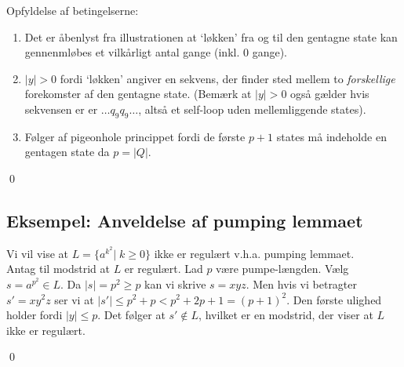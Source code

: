 Opfyldelse af betingelserne: 
\begin{enumerate}
	\item Det er åbenlyst fra illustrationen at `løkken' fra og til den gentagne state kan gennenmløbes et vilkårligt antal gange (inkl. 0 gange). 
	\item $|y|>0$ fordi `løkken' angiver en sekvens, der finder sted mellem to \textit{forskellige} forekomster af den gentagne state. (Bemærk at $|y|>0$ også gælder hvis sekvensen er er $\ldots q_9q_9 \ldots$, altså et self-loop uden mellemliggende states). 
	\item Følger af pigeonhole princippet fordi de første $p+1$ states må indeholde en gentagen state da $p=|Q|$.    
\end{enumerate} 
\begin{flushright}
	\qed
\end{flushright}

\subsection*{Eksempel: Anveldelse af pumping lemmaet}

Vi vil vise at $L=\{a^{k^{2}}| \; k \ge 0\}$ ikke er regulært v.h.a. pumping lemmaet. \\

Antag til modstrid at $L$ er regulært. Lad $p$ være pumpe-længden. Vælg $s=a^{p^{2}} \in L$. Da $|s|=p^2 \ge p$ kan vi skrive $s=xyz$. Men hvis vi betragter $s'=xy^2z$ ser vi at $|s'| \le p^2 + p < p^2+2p+1=(p+1)^2$. Den første ulighed holder fordi $|y| \le p$. Det følger at $s' \notin L$, hvilket er en modstrid, der viser at $L$ ikke er regulært. 
\begin{flushright}
	\qed
\end{flushright}    

